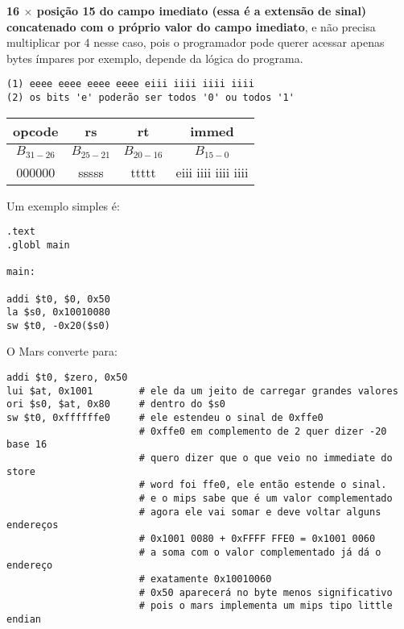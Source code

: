 \documentclass{article}
\begin{document}
\textbf{16 $\times$ {posição 15 do campo imediato} (essa é a extensão de 
sinal) concatenado com o próprio valor do campo imediato}, e não precisa 
multiplicar por 4 nesse caso, pois o programador pode querer acessar apenas 
bytes ímpares por exemplo, depende da lógica do programa.

\begin{verbatim}
(1) eeee eeee eeee eeee eiii iiii iiii iiii
(2) os bits 'e' poderão ser todos '0' ou todos '1'
\end{verbatim}

\begin{table}[ht!]
  \begin{tabular}{|c|c|c|c|}
    \hline opcode & rs & rt & immed \\ 
    \hline $B_{31-26}$ & $B_{25-21}$ & $B_{20-16}$ & $B_{15-0}$ \\ 
    \hline 000000 & sssss & ttttt & eiii iiii iiii iiii \\ 
    \hline
  \end{tabular}
\end{table}

Um exemplo simples é:

\begin{verbatim}
.text
.globl main

main:

addi $t0, $0, 0x50
la $s0, 0x10010080
sw $t0, -0x20($s0)
\end{verbatim}

O Mars converte para:

\begin{verbatim}
addi $t0, $zero, 0x50
lui $at, 0x1001        # ele da um jeito de carregar grandes valores
ori $s0, $at, 0x80     # dentro do $s0
sw $t0, 0xffffffe0     # ele estendeu o sinal de 0xffe0
                       # 0xffe0 em complemento de 2 quer dizer -20 base 16
                       # quero dizer que o que veio no immediate do store
                       # word foi ffe0, ele então estende o sinal.
                       # e o mips sabe que é um valor complementado
                       # agora ele vai somar e deve voltar alguns endereços
                       # 0x1001 0080 + 0xFFFF FFE0 = 0x1001 0060
                       # a soma com o valor complementado já dá o endereço
                       # exatamente 0x10010060
                       # 0x50 aparecerá no byte menos significativo
                       # pois o mars implementa um mips tipo little endian
\end{verbatim}
\end{document}
